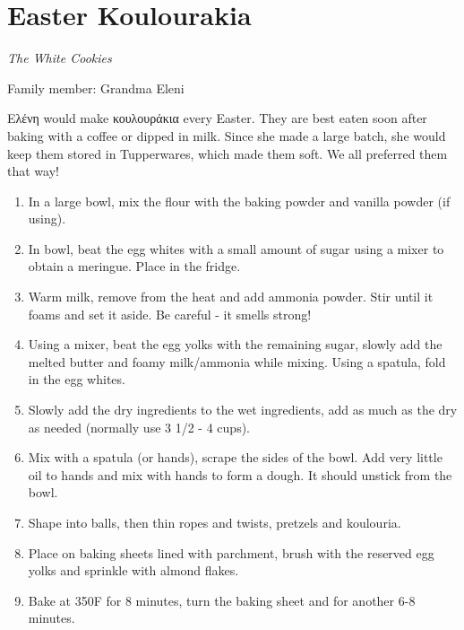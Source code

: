 \chapter{Easter Koulourakia}
\label{ch:easter_koulourakia}


\textit{The White Cookies}

Family member: Grandma Eleni

 \textgreek{Ελένη} would make \textgreek{κουλουράκια} every Easter. They are best eaten soon after baking with a coffee or dipped in milk. Since she made a large batch, she would keep them stored in Tupperwares, which made them soft. We all preferred them that way!

\begin{enumerate}
    \item In a large bowl, mix the flour with the baking powder and vanilla powder (if using).
    \item In bowl, beat the egg whites with a small amount of sugar using a mixer to obtain a meringue. Place in the fridge.
    \item Warm milk, remove from the heat and add ammonia powder. Stir until it foams and set it aside. Be careful - it smells strong!
    \item Using a mixer, beat the egg yolks with the remaining sugar, slowly add the melted butter and foamy milk/ammonia while mixing. Using a spatula, fold in the egg whites.
    \item Slowly add the dry ingredients to the wet ingredients, add as much as the dry as needed (normally use 3 1/2 - 4 cups).
    \item Mix with a spatula (or hands), scrape the sides of the bowl. Add very little oil to hands and mix with hands to form a dough. It should unstick from the bowl.
    \item Shape into balls, then thin ropes and twists, pretzels and koulouria.
    \item Place on baking sheets lined with parchment, brush with the reserved egg yolks and sprinkle with almond flakes.
    \item Bake at 350\degree F for 8 minutes, turn the baking sheet and for another 6-8 minutes.
\end{enumerate}

